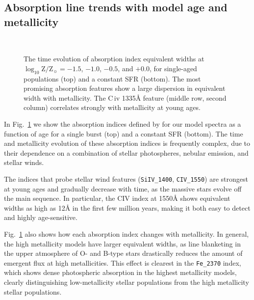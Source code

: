\documentclass[preprint2]{aastex61}
\newcommand{\civ}{C\,{\sc iv}\xspace}
\newcommand{\logten}{\ensuremath{\log_{10}}}
\newcommand{\logZeq}[1]{\ensuremath{\logten \mathrm{Z}/\mathrm{Z}_{\sun} = #1}}
\newcommand{\ang}{\ensuremath{\mbox{\AA}}\xspace}
\begin{document}
\subsection{Absorption line trends with model age and metallicity} \label{sec:mod:abs}
\begin{figure}
  \begin{center}
    \\
    \caption{The time evolution of absorption index equivalent widths at \logZeq{-1.5}, $-1.0$, $-0.5$, and $+0.0$, for single-aged populations (top) and a constant SFR (bottom). The most promising absorption features show a large dispersion in equivalent width with metallicity. The \civ 1335\ang feature (middle row, second column) correlates strongly with metallicity at young ages.}
    \label{fig:EWTimeEvol}
  \end{center}
\end{figure}

In Fig.~\ref{fig:EWTimeEvol} we show the absorption indices defined by \citet{Leitherer+2011} for our model spectra as a function of age for a single burst (top) and a constant SFR (bottom). The time and metallicity evolution of these absorption indices is frequently complex, due to their dependence on a combination of stellar photospheres, nebular emission, and stellar winds.

The indices that probe stellar wind features (\texttt{SiIV\_1400}, \texttt{CIV\_1550}) are strongest at young ages and gradually decrease with time, as the massive stars evolve off the main sequence. In particular, the C\textsc{IV} index at 1550\ang shows equivalent widths as high as 12\ang in the first few million years, making it both easy to detect and highly age-sensitive.

Fig.~\ref{fig:EWTimeEvol} also shows how each absorption index changes with metallicity. In general, the high metallicity models have larger equivalent widths, as line blanketing in the upper atmosphere of O- and B-type stars drastically reduces the amount of emergent flux at high metallicities. This effect is clearest in the \texttt{Fe\_2370} index, which shows dense photospheric absorption in the highest metallicity models, clearly distinguishing low-metallicity stellar populations from the high metallicity stellar populations. 
\end{document}
